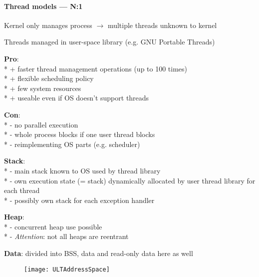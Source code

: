 \paragraph{Thread models --- N:1}
\begin{items}
  \item Kernel only manages process \( \to \) multiple threads unknown to kernel 
  \item Threads managed in user-space library (e.g. GNU Portable Threads)
  \item \textbf{Pro}: \\*
    + faster thread management operations (up to 100 times) \\*
    + flexible scheduling policy \\*
    + few system resources \\*
    + useable even if OS doesn't support threads
  \item \textbf{Con}: \\*
    - no parallel execution \\*
    - whole process blocks if one user thread blocks \\*
    - reimplementing OS parts (e.g. scheduler)
  \item \textbf{Stack}: \\*
    - main stack known to OS used by thread library \\*
    - own execution state (= stack) dynamically allocated by user thread library for each thread \\*
    - possibly own stack for each exception handler
  \item \textbf{Heap}: \\*
    - concurrent heap use possible \\*
    - \emph{Attention}: not all heaps are reentrant
  \item \textbf{Data}: divided into BSS, data and read-only data here as well
\end{items}
\begin{figure}[H]\centering\label{ULTAddressSpace}\texttt{[image: ULTAddressSpace]}\end{figure}

